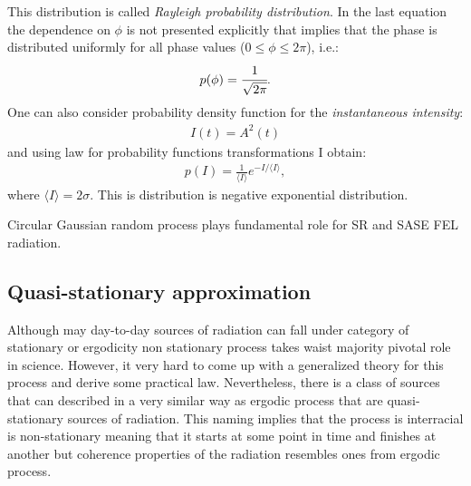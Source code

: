     This distribution is called \textit{Rayleigh probability distribution}. In the last equation the dependence on $\phi$ is not presented explicitly that implies that the phase is distributed uniformly for all phase values ($0 \leq \phi \leq 2 \pi$), i.e.:
    \begin{align}
        p(\phi) = \cfrac{1}{\sqrt{2 \pi}}.
    \end{align}
    One can also consider probability density function for the \textit{instantaneous intensity}:
    \begin{align}
        I(t) = A^2(t)
    \end{align}
    and using law for probability functions transformations I obtain:
    \begin{align}
        p(I) = \frac{1}{\langle I \rangle} e^{-I/\langle I \rangle},
    \end{align}
    where $\langle I \rangle = 2 \sigma$. This is distribution is negative exponential distribution. 

    Circular Gaussian random process plays fundamental role for SR and SASE FEL radiation. 
    
\subsection{Quasi-stationary approximation}
    Although may day-to-day sources of radiation can fall under category of stationary or ergodicity non stationary process takes waist majority pivotal role in science. However, it very hard to come up with a generalized theory for this process and derive some practical law. Nevertheless, there is a class of sources that can described in a very similar way as ergodic process that are quasi-stationary sources of radiation. This naming implies that the process is interracial is non-stationary meaning that it starts at some point in time and finishes at another but coherence properties of the radiation resembles ones from ergodic process.
    
